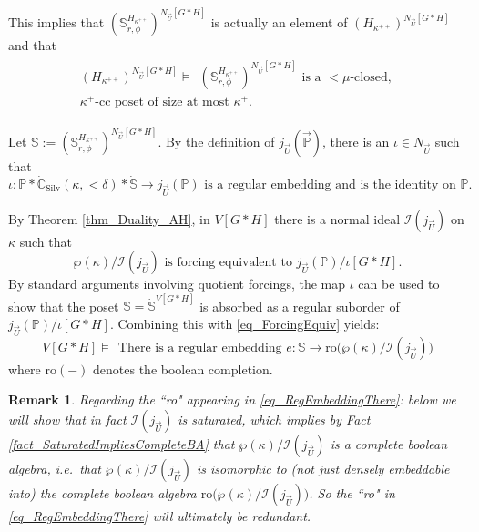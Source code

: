 \documentclass{amsart}
\newtheorem{remark}[theorem]{Remark}
\begin{document}
This implies that $(\mathbb{S}^{H_{\kappa^{++}}}_{r,\phi})^{N_{\vec{U}}[G*H]}$ is actually an element of $(H_{\kappa^{++}})^{N_{\vec{U}}[G*H]}$ and that
\begin{align}\label{eq_LocallyBelieved}
\begin{split}
(H_{\kappa^{++}})^{N_{\vec{U}}[G*H]} \models \ \ (\mathbb{S}^{H_{\kappa^{++}}}_{r,\phi})^{N_{\vec{U}}[G*H]} \text{ is a } <\mu \text{-closed, } \\
\kappa^+ \text{-cc poset of size at most } \kappa^+.
\end{split}
\end{align}

Let $\mathbb{S}:= (\mathbb{S}^{H_{\kappa^{++}}}_{r,\phi})^{N_{\vec{U}}[G*H]}$.  By the definition of $j_{\vec{U}}(\vec{\mathbb{P}})$, there is an $\iota \in N_{\vec{U}}$ such that
\[
\iota: \mathbb{P}*\dot{\mathbb{C}}_{\text{Silv}}(\kappa, < \delta)*\dot{\mathbb{S}} \to j_{\vec{U}}(\mathbb{P}) \text{ is a regular embedding and is the identity on } \mathbb{P}.
\]

By Theorem \ref{thm_Duality_AH}, in $V[G*H]$ there is a normal ideal $\mathcal{I}(j_{\vec{U}})$ on $\kappa$ such that
\begin{equation}\label{eq_ForcingEquiv}
\wp(\kappa)/\mathcal{I}(j_{\vec{U}}) \text{ is forcing equivalent to } j_{\vec{U}}(\mathbb{P})/ \iota[G*H].
\end{equation}
By standard arguments involving quotient forcings, the map $\iota$ can be used to show that the poset $\mathbb{S} = \dot{\mathbb{S}}^{V[G*H]}$ is absorbed as a regular suborder of $j_{\vec{U}}(\mathbb{P})/ \iota[G*H]$.  Combining this with \eqref{eq_ForcingEquiv} yields:
\begin{equation}\label{eq_RegEmbeddingThere}
V[G*H] \models \ \ \text{There is a regular embedding } e: \mathbb{S} \to \text{ro} \big( \wp(\kappa)/\mathcal{I}(j_{\vec{U}}) \big)
\end{equation}
where $\text{ro}(-)$ denotes the boolean completion.

\begin{remark}
Regarding the ``ro" appearing in \eqref{eq_RegEmbeddingThere}:  below we will show that in fact $\mathcal{I}(j_{\vec{U}})$ is saturated, which implies by Fact \ref{fact_SaturatedImpliesCompleteBA} that $\wp(\kappa)/\mathcal{I}(j_{\vec{U}})$ is a complete boolean algebra, i.e.\ that $\wp(\kappa)/\mathcal{I}(j_{\vec{U}})$ is isomorphic to (not just densely embeddable into) the complete boolean algebra $\text{ro} \big( \wp(\kappa)/\mathcal{I}(j_{\vec{U}}) \big)$.  So the ``ro" in \eqref{eq_RegEmbeddingThere} will ultimately be redundant.
\end{remark} 
\end{document}
